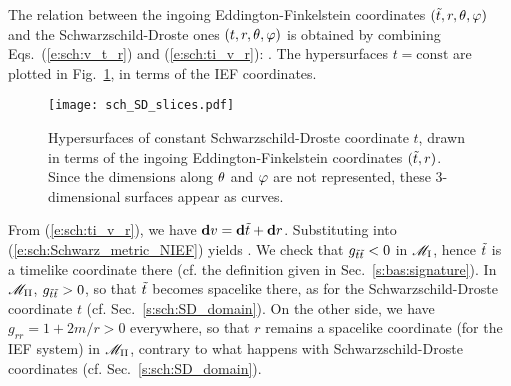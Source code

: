 The relation between the ingoing Eddington-Finkelstein coordinates
$({\tilde t}, r, \theta,\varphi)$
and the Schwarzschild-Droste ones $(t,r,\theta,\varphi)$ is obtained by combining
Eqs.~(\ref{e:sch:v_t_r}) and (\ref{e:sch:ti_v_r}):
\be \label{e:sch:ti_t_r}
      .
\ee
The hypersurfaces $t=\mathrm{const}$ are plotted in Fig.~\ref{f:sch:SD_slices},
in terms of the IEF coordinates.

\begin{figure}
\centerline{\texttt{[image: sch\_SD\_slices.pdf]}}
\caption[]{\label{f:sch:SD_slices} \footnotesize
Hypersurfaces of constant Schwarzschild-Droste coordinate $t$, drawn in terms
of the ingoing Eddington-Finkelstein coordinates $({\tilde t},r)$. Since the dimensions
along $\theta$ and $\varphi$ are not represented, these 3-dimensional surfaces appear
as curves.}
\end{figure}

From (\ref{e:sch:ti_v_r}), we have $\mathbf{d} v = \mathbf{d}{\tilde t} + \mathbf{d} r$. Substituting
into (\ref{e:sch:Schwarz_metric_NIEF}) yields
\be \label{e:sch:Schwarz_metric_EF}
    .
\ee
We check that $g_{{\tilde t}{\tilde t}} < 0$ in $\mathscr{M}_{\rm I}$, hence ${\tilde t}$ is
a timelike coordinate there (cf. the definition given in Sec.~\ref{s:bas:signature}).
In $\mathscr{M}_{\rm II}$, $g_{{\tilde t}{\tilde t}} > 0$, so that ${\tilde t}$ becomes spacelike
there, as for the Schwarzschild-Droste coordinate $t$ (cf. Sec.~\ref{s:sch:SD_domain}).
On the other side, we have $g_{rr} = 1+2m/r > 0$ everywhere, so that $r$ remains a spacelike coordinate (for the IEF system) in
$\mathscr{M}_{\rm II}$, contrary to what happens with Schwarzschild-Droste coordinates
(cf. Sec.~\ref{s:sch:SD_domain}).

